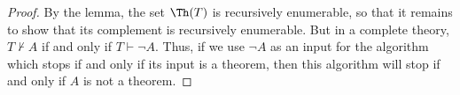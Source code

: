 

\setcounter{section}{3}
\setcounter{subsection}{5}
\setcounter{dfn}{34}

\begin{proof}
By the lemma, the set $\Th(T)$ is recursively enumerable, so that it remains to show that its complement is recursively enumerable.
But in a complete theory, $T \not\vdash A$ if and only if $T \vdash \neg A$.
Thus, if we use $\neg A$ as an input for the algorithm which stops if and only if its input is a theorem, then this algorithm will stop if and only if
$A$ is not a theorem.
\end{proof}



